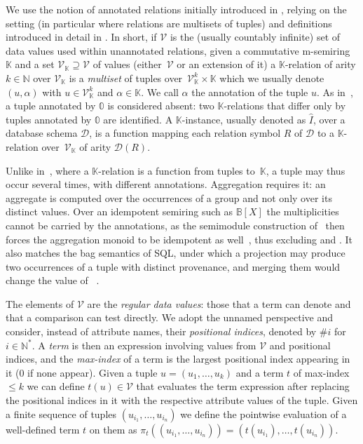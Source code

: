 We use the notion of annotated relations initially introduced in
\cite{green2007provenance}, relying on the setting (in particular where
relations are multisets of tuples) and definitions introduced in detail in
\cite[Section IV]{sen2026provsql}.
In short, if $\mathcal{V}$ is the (usually countably infinite) set of
data values used within unannotated relations, given a commutative m-semiring
$\mathbb K$ and a set $\mathcal V_{\mathbb K}\supseteq \mathcal V$ of
values (either~$\mathcal V$ or an extension of it) a
$\mathbb K$-relation of arity $k\in\mathbb N$ over $\mathcal V_{\mathbb
K}$ is a \emph{multiset} of tuples over~$\mathcal V_{\mathbb K}^k\times\mathbb
K$ which we usually denote $(u,\alpha)$ with $u\in \mathcal V_{\mathbb K}^k$ and $\alpha\in \mathbb K$.
We call $\alpha$ the annotation of the tuple $u$. As
in~\cite{green2007provenance}, a tuple annotated by $\mathbb 0$ is
considered absent: two $\mathbb K$-relations that differ only by tuples
annotated by $\mathbb 0$ are identified.
A $\mathbb K$-instance, usually denoted as $\hat I$, over a database
schema $\mathcal D$, is a function mapping each relation symbol $R$ of $\mathcal D$ to a $\mathbb K$-relation over~$\mathcal V_{\mathbb K}$ of arity $\mathcal D(R)$.

Unlike in~\cite{green2007provenance}, where a $\mathbb K$-relation is a
function from tuples to~$\mathbb K$, a tuple may thus occur several
times, with different annotations. Aggregation requires it: an aggregate
is computed over the occurrences of a group and not only over its distinct
values. Over an idempotent semiring such as $\mathbb B[X]$ the
multiplicities cannot be carried by the annotations, as the semimodule
construction of~\cite{amsterdamer2011provenance} then forces the
aggregation monoid to be idempotent as
well~\cite[Proposition~3.11]{amsterdamer2011provenance}, thus excluding
 and . It also matches the bag semantics of SQL,
under which a projection may produce two occurrences of a tuple with
distinct provenance, and merging them would change the value of
~\cite{sen2026provsql}.

The elements of $\mathcal V$ are the \emph{regular data values}: those
that a term can denote and that a comparison can test directly.
We adopt the unnamed perspective and consider, instead of attribute names, their \emph{positional indices}, denoted by $\#i$ for $i\in \mathbb N^*$.
A \emph{term} is then an expression involving values from $\mathcal V$
and positional indices, and the \emph{max-index} of a term is the largest
positional index appearing in it ($0$ if none appear). Given a tuple
$u=(u_1,\dots,u_k)$ and a term $t$ of max-index $\leq k$ we can define $t(u)\in \mathcal V$ that evaluates the term expression after replacing the positional indices in it with the respective attribute values of the tuple. Given a finite sequence of tuples $(u_{i_1},\dots,u_{i_n})$ we define the pointwise evaluation of a well-defined term $t$ on them as $\pi_{t}((u_{i_1},\dots,u_{i_n}))=(t(u_{i_1}),\dots,t(u_{i_n}))$.

